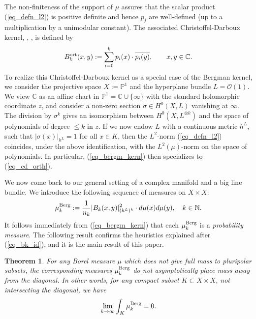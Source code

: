\documentclass[12pt]{article}
\numberwithin{equation}{section}
\theoremstyle{theorem}
\newtheorem{thm}{Theorem}[section]
\theoremstyle{definition}
\theoremstyle{remark}
\newcommand{\comp}{\mathbb{C}}
\newcommand{\nat}{\mathbb{N}}
\begin{document}
	The non-finiteness of the support of $\mu$ assures that the scalar product (\ref{eq_defn_l2}) is positive definite and hence $p_j$ are well-defined (up to a multiplication by a unimodular constant).
	The associated Christoffel-Darboux kernel, \cite{Christoffel}, \cite{Darboux}, is defined by
	\begin{equation}\label{eq_cd_orth}
		B_k^{{\rm{ort}}}(x, y) := \sum_{i = 0}^{k} p_i(x) \cdot \overline{p_i(y)}, \qquad x, y \in \comp.
	\end{equation}
	To realize this Christoffel-Darboux kernel as a special case of the Bergman kernel, we consider the projective space $X := \mathbb{P}^1$ and the hyperplane bundle $L = \mathscr{O}(1)$. 
	We view $\mathbb{C}$ as an affine chart in $\mathbb{P}^1 = \mathbb{C} \cup \{\infty\}$ with the standard holomorphic coordinate $z$, and consider a non-zero section $\sigma \in H^0(X, L)$ vanishing at $\infty$. 
	The division by $\sigma^{k}$ gives an isomorphism between $H^0(X, L^{\otimes k})$ and the space of polynomials of degree $\leq k$ in $z$. 
	If we now endow $L$ with a continuous metric $h^L$, such that $|\sigma(x)|_{h^L} = 1$ for all $x \in K$, then the $L^2$-norm (\ref{eq_defn_l2}) coincides, under the above identification, with the $L^2(\mu)$-norm on the space of polynomials. 
	In particular, (\ref{eq_bergm_kern}) then specializes to (\ref{eq_cd_orth}).
	\par 
	We now come back to our general setting of a complex manifold and a big line bundle.
	We introduce the following sequence of measures on $X \times X$:
	\begin{equation}\label{eq_mu_begmm}
		\mu_k^{\rm{Berg}} := \frac{1}{n_k} |B_k(x, y)|^{2}_{(h^L)^k} \cdot d\mu(x) d\mu(y), \quad k \in \nat.
	\end{equation}
	It follows immediately from (\ref{eq_bergm_kern}) that each $\mu_k^{\rm{Berg}}$ is a \textit{probability measure}.
	The following result confirms the heuristics explained after (\ref{eq_bk_id}), and it is the main result of this paper.
	\par 
	\begin{thm}\label{thm_off_diag}
		For any Borel measure $\mu$ which does not give full mass to pluripolar subsets, the corresponding measures $\mu_k^{\rm{Berg}}$ do not asymptotically place mass away from the diagonal.
		In other words, for any compact subset $K \subset X \times X$, not intersecting the diagonal, we have
		\begin{equation}\label{eq_thm_off_diag}
			\lim_{k \to \infty} \int_{K} \mu_k^{\rm{Berg}} = 0.
 		\end{equation}
	\end{thm}
\end{document}
